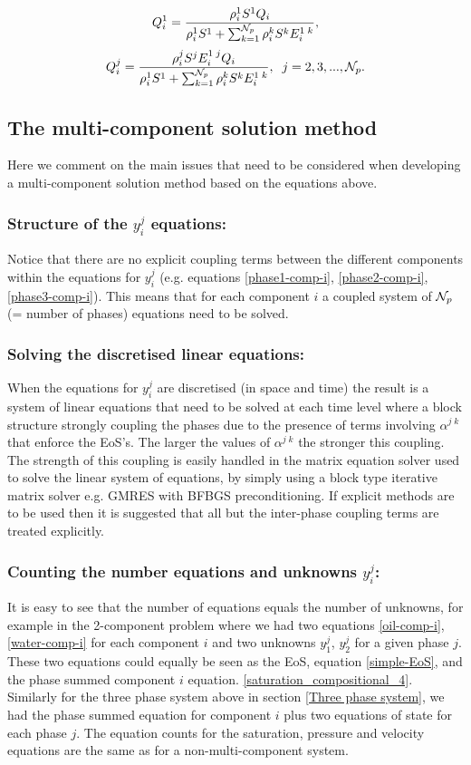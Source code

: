\begin{eqnarray}
Q_i^1= \frac{\rho_i^1 S^1 Q_i}
{\rho_i^1 S^1 +\sum_{k=1}^{{\cal N}_p} \rho_i^k S^k E_i^{1\; k} }, 
\label{Qi1}
\end{eqnarray}
\begin{eqnarray}
Q_i^j= \frac{\rho_i^j S^j E_i^{1\; j} Q_i}
{\rho_i^1 S^1 +\sum_{k=1}^{{\cal N}_p} \rho_i^k S^k E_i^{1\; k} }, \;\; j=2,3,..., {{\cal N}_p}. 
\label{Qi2}
\end{eqnarray}


\subsection{The multi-component solution method}
Here we comment on the main issues that need to be 
considered when developing 
a multi-component solution method based on 
the equations above. 
\subsubsection{Structure of the $y_i^j$ equations:} Notice that there 
are no explicit 
coupling terms between the different components within the equations 
for $y_i^j$ (e.g. equations \ref{phase1-comp-i}, \ref{phase2-comp-i}, \ref{phase3-comp-i}). 
This means that for each component $i$ a coupled system of ${\cal N}_p$ (= number of phases) equations need to be solved. 
\subsubsection{Solving the discretised linear equations:} When the 
equations for $y_i^j$ are discretised (in space and time) the 
result is a system of linear  equations that need to be solved at each time level where a block structure strongly coupling the phases due to the presence of terms involving $\alpha^{j\;k}$ that enforce the EoS's. 
The larger the values of $\alpha^{j\;k}$ the 
stronger this coupling. The strength of this coupling is easily 
handled in the matrix equation solver used to solve the linear system of equations, by simply using a block type iterative matrix solver e.g. GMRES with BFBGS preconditioning. 
If explicit methods are to be used then it is suggested 
that all but the inter-phase coupling terms are treated explicitly. 


\subsubsection{Counting the number equations and unknowns $y_i^j$:} 
It is easy to see that the number of equations equals the number of unknowns, for example in the 2-component problem where we had two equations \ref{oil-comp-i}, \ref{water-comp-i} for each component $i$ and two unknowns $y_1^j$, $y_2^j$ for a given phase $j$. 
These two equations could equally be seen 
as the EoS, equation \ref{simple-EoS}, and the phase summed component $i$ 
equation. 
\ref{saturation_compositional_4}. 
Similarly for the three phase system above in section \ref{Three phase system}, 
we had the 
phase summed equation for component $i$ plus two equations 
of state for each phase $j$. The equation counts for the saturation, pressure 
and velocity equations are the same as for a non-multi-component system. 


